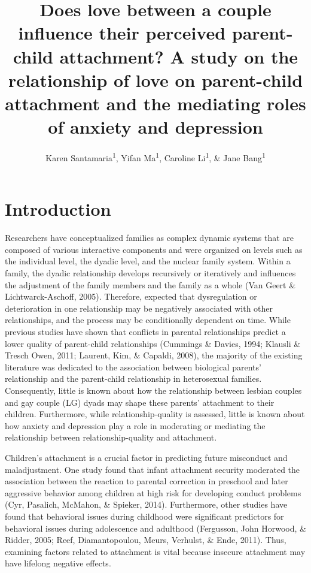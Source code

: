\documentclass[man]{apa6}
\title{Does love between a couple influence their perceived parent-child attachment? A study on the relationship of love on parent-child attachment and the mediating roles of anxiety and depression}
\author{Karen Santamaria\textsuperscript{1}, Yifan Ma\textsuperscript{1}, Caroline Li\textsuperscript{1}, \& Jane Bang\textsuperscript{1}}
\date{}
\affiliation{
\vspace{0.5cm}
\textsuperscript{1} Smith College}
\begin{document}
\maketitle

\hypertarget{introduction}{%
\section{Introduction}\label{introduction}}

Researchers have conceptualized families as complex dynamic systems that are composed of various interactive components and were organized on levels such as the individual level, the dyadic level, and the nuclear family system. Within a family, the dyadic relationship develops recursively or iteratively and influences the adjustment of the family members and the family as a whole (Van Geert \& Lichtwarck-Aschoff, 2005). Therefore, expected that dysregulation or deterioration in one relationship may be negatively associated with other relationships, and the process may be conditionally dependent on time. While previous studies have shown that conflicts in parental relationships predict a lower quality of parent-child relationships (Cummings \& Davies, 1994; Klausli \& Tresch Owen, 2011; Laurent, Kim, \& Capaldi, 2008), the majority of the existing literature was dedicated to the association between biological parents' relationship and the parent-child relationship in heterosexual families. Consequently, little is known about how the relationship between lesbian couples and gay couple (LG) dyads may shape these parents' attachment to their children. Furthermore, while relationship-quality is assessed, little is known about how anxiety and depression play a role in moderating or mediating the relationship between relationship-quality and attachment.

Children's attachment is a crucial factor in predicting future misconduct and maladjustment. One study found that infant attachment security moderated the association between the reaction to parental correction in preschool and later aggressive behavior among children at high risk for developing conduct problems (Cyr, Pasalich, McMahon, \& Spieker, 2014). Furthermore, other studies have found that behavioral issues during childhood were significant predictors for behavioral issues during adolescence and adulthood (Fergusson, John Horwood, \& Ridder, 2005; Reef, Diamantopoulou, Meurs, Verhulst, \& Ende, 2011). Thus, examining factors related to attachment is vital because insecure attachment may have lifelong negative effects.
\end{document}
